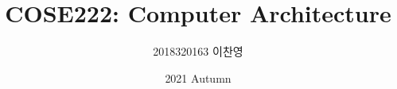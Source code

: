 

\title{COSE222: Computer Architecture}
\author{2018320163 이찬영}
\date{2021 Autumn}


    \maketitle
    \tableofcontents

